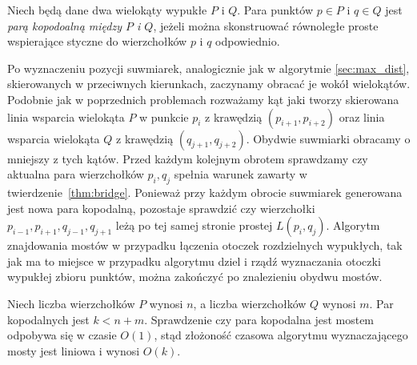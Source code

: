 \begin{definicja}
  Niech będą dane dwa wielokąty wypukłe $P$ i $Q$. Para punktów $p \in
  P$ i $q \in Q$ jest \emph{parą kopodoalną między $P$ i $Q$}, jeżeli
  można skonstruować równoległe proste wspierające styczne do
  wierzchołków $p$ i $q$ odpowiednio.
\end{definicja}

Po wyznaczeniu pozycji suwmiarek, analogicznie jak w algorytmie
\ref{sec:max_dist}, skierowanych w przeciwnych kierunkach, zaczynamy
obracać je wokół wielokątów. Podobnie jak w poprzednich problemach
rozważamy kąt jaki tworzy skierowana linia wsparcia wielokąta $P$ w
punkcie $p_i$ z krawędzią $(p_{i+1}, p_{i+2})$ oraz linia wsparcia
wielokąta $Q$ z krawędzią $(q_{j+1}, q_{j+2})$. Obydwie suwmiarki
obracamy o mniejszy z tych kątów. Przed każdym kolejnym obrotem
sprawdzamy czy aktualna para wierzchołków $p_i, q_j$ spełnia warunek
zawarty w twierdzenie~\ref{thm:bridge}. Ponieważ przy każdym obrocie
suwmiarek generowana jest nowa para kopodalną, pozostaje sprawdzić czy
wierzchołki $p_{i-1}, p_{i+1}, q_{j-1}, q_{j+1}$ leżą po tej samej
stronie prostej $L(p_i, q_j)$. Algorytm znajdowania mostów w przypadku
łączenia otoczek rozdzielnych wypukłych, tak jak ma to miejsce w
przypadku algorytmu dziel i rządź wyznaczania otoczki wypukłej zbioru
punktów, można zakończyć po znalezieniu obydwu mostów.

Niech liczba wierzchołków $P$ wynosi $n$, a liczba wierzchołków $Q$
wynosi $m$. Par kopodalnych jest $k < n + m$. Sprawdzenie czy para
kopodalna jest mostem odpobywa się w czasie $O(1)$, stąd złożoność
czasowa algorytmu wyznaczającego mosty jest liniowa i wynosi $O(k)$.

